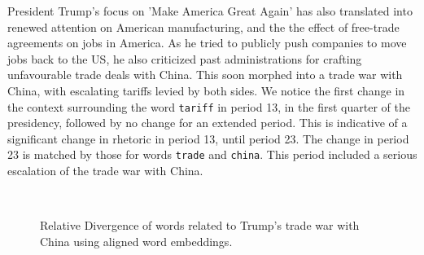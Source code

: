 President Trump's focus on 'Make America Great Again' has also translated into renewed attention on American manufacturing, and the the effect of free-trade agreements on jobs in America. As he tried to publicly push companies to move jobs back to the US, he also criticized past administrations for crafting unfavourable trade deals with China. This soon morphed into a trade war with China, with escalating tariffs levied by both sides.  We notice the first change in the context surrounding the word \texttt{tariff} in period 13, in the first quarter of the presidency, followed by no change for an extended period. This is indicative of a significant change in rhetoric in period 13, until period 23. The change in period 23 is matched by those for words \texttt{trade} and \texttt{china}. This period included a serious escalation of the trade war with China. 

\begin{figure}[b]%

    \centering

     ~
     ~
    
    \caption{Relative Divergence of words related to Trump's trade war with China using aligned word embeddings.}%

    \label{fig:div_trade}%

\end{figure}


